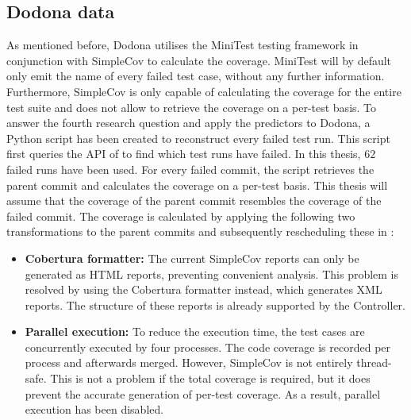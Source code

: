 
\subsection{Dodona data}
As mentioned before, Dodona utilises the MiniTest testing framework in conjunction with SimpleCov to calculate the coverage. MiniTest will by default only emit the name of every failed test case, without any further information. Furthermore, SimpleCov is only capable of calculating the coverage for the entire test suite and does not allow to retrieve the coverage on a per-test basis. To answer the fourth research question and apply the \velocity{} predictors to Dodona, a Python script has been created to reconstruct every failed test run. This script first queries the API of \githubactions{} to find which test runs have failed. In this thesis, $\SI{62}{}$ failed runs have been used. For every failed commit, the script retrieves the parent commit and calculates the coverage on a per-test basis. This thesis will assume that the coverage of the parent commit resembles the coverage of the failed commit. The coverage is calculated by applying the following two transformations to the parent commits and subsequently rescheduling these in \githubactions{}:

\begin{itemize}
	\item \textbf{Cobertura formatter:} The current SimpleCov reports can only be generated as HTML reports, preventing convenient analysis. This problem is resolved by using the Cobertura formatter instead, which generates XML reports. The structure of these reports is already supported by the Controller.
	
	\item \textbf{Parallel execution:} To reduce the execution time, the test cases are concurrently executed by four processes. The code coverage is recorded per process and afterwards merged. However, SimpleCov is not entirely thread-safe. This is not a problem if the total coverage is required, but it does prevent the accurate generation of per-test coverage. As a result, parallel execution has been disabled.
	
\end{itemize}